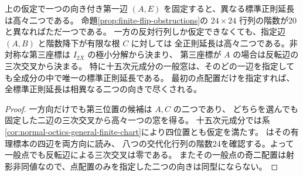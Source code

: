 \begin{corollary}\label{cor:finite-reconstruction-one-edge}
上の仮定で一つの向き付き第一辺 $(A,E)$ を固定すると、異なる標準正則延長は高々二つである。
命題\ref{prop:finite-flip-obstructions}の $24\times24$ 行列の階数が20と異なればただ一つである。
一方の反対行列しか仮定できなくても、指定辺 $(A,B)$ と階数降下が有限な根 $C$ に対しては
全正則延長は高々二つである。非対称な第三座標は $I_{2X}$ の極小分解から決まり、
第三座標が $A$ の場合は反転辺の三次交叉から決まる。
特に十五次元成分の一般窓は、そのどの一辺を指定しても全成分の中で唯一の標準正則延長である。
最初の点配置だけを指定すれば、全標準正則延長は相異なる二つの向きで尽くされる。
\end{corollary}
\begin{proof}
一方向だけでも第三位置の候補は $A,C$ の二つであり、
どちらを選んでも固定した二辺の三次交叉から高々一つの窓を得る。
十五次元成分では系\ref{cor:normal-octics-general-finite-chart}により四位置とも仮定を満たす。
 はその有理標本の四辺を両方向に読み、
八つの交代化行列の階数24を確認する。よって一般点でも反転辺による三次交叉は零である。
またその一般点の奇二配置は射影非同値なので、点配置のみを指定した二つの向きは同型にならない。
\end{proof}

